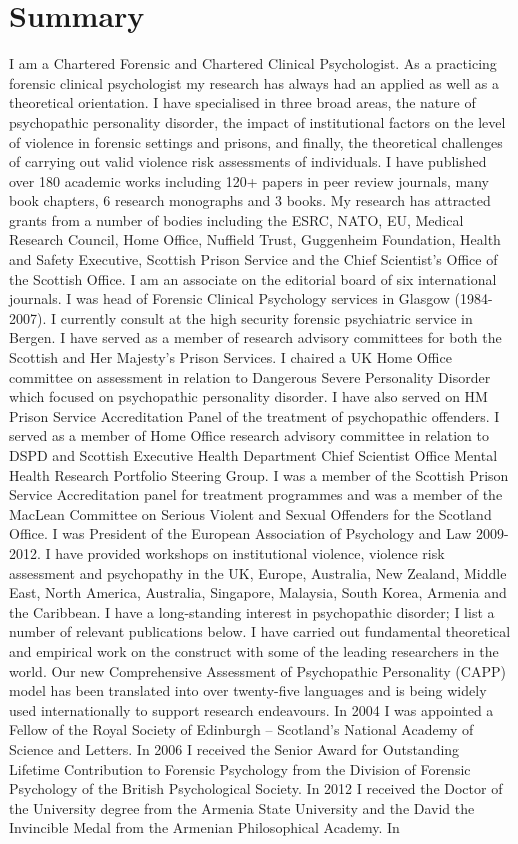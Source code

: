 \documentclass [a4paper,10pt]{article}
\begin{document}
\section{Summary}
I am a Chartered Forensic and Chartered Clinical Psychologist. As a practicing forensic clinical psychologist my research has always had an applied as well as a theoretical orientation. I have specialised in three broad areas, the nature of psychopathic personality disorder, the impact of institutional factors on the level of violence in forensic settings and prisons, and finally, the theoretical challenges of carrying out valid violence risk assessments of individuals. I have published over 180 academic works including 120+ papers in peer review journals, many book chapters, 6 research monographs and 3 books. My research has attracted grants from a number of bodies including the ESRC, NATO, EU, Medical Research Council, Home Office, Nuffield Trust, Guggenheim Foundation, Health and Safety Executive, Scottish Prison Service and the Chief Scientist's Office of the Scottish Office. I am an associate on the editorial board of six international journals. I was head of Forensic Clinical Psychology services in Glasgow (1984-2007). I currently consult at the high security forensic psychiatric service in Bergen. I have served as a member of research advisory committees for both the Scottish and Her Majesty's Prison Services. I chaired a UK Home Office committee on assessment in relation to Dangerous Severe Personality Disorder which focused on psychopathic personality disorder. I have also served on HM Prison Service Accreditation Panel of the treatment of psychopathic offenders. I served as a member of Home Office research advisory committee in relation to DSPD and Scottish Executive Health Department Chief Scientist Office Mental Health Research Portfolio Steering Group. I was a member of the Scottish Prison Service Accreditation panel for treatment programmes and was a member of the MacLean Committee on Serious Violent and Sexual Offenders for the Scotland Office. I was President of the European Association of Psychology and Law 2009-2012. I have provided workshops on institutional violence, violence risk assessment and psychopathy in the UK, Europe, Australia, New Zealand, Middle East, North America, Australia, Singapore, Malaysia, South Korea, Armenia and the Caribbean. I have a long-standing interest in psychopathic disorder; I list a number of relevant publications below. I have carried out fundamental theoretical and empirical work on the construct with some of the leading researchers in the world. Our new Comprehensive Assessment of Psychopathic Personality (CAPP) model has been translated into over twenty-five languages and is being widely used internationally to support research endeavours. In 2004 I was appointed a Fellow of the Royal Society of Edinburgh – Scotland’s National Academy of Science and Letters. In 2006 I received the Senior Award for Outstanding Lifetime Contribution to Forensic Psychology from the Division of Forensic Psychology of the British Psychological Society. In 2012 I received the Doctor of the University degree from the Armenia State University and the David the Invincible Medal from the Armenian Philosophical Academy. In 
\end{document}

